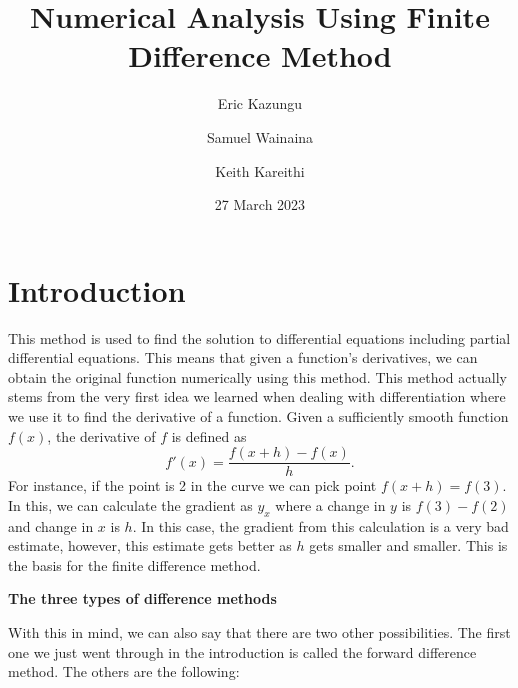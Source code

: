 \title{Numerical Analysis Using Finite Difference Method}
\author{Eric Kazungu \and Samuel Wainaina \and Keith Kareithi}

\date{27 March 2023}



\maketitle
\section*{Introduction}
This method is used to find the solution to differential equations including partial differential equations. This means that given a function's derivatives, we can obtain the original function numerically using this method. This method actually stems from the very first idea we learned when dealing with differentiation where we use it to find the derivative of a function. Given a sufficiently smooth function $f(x)$, the derivative of $f$ is defined as
\begin{equation*}
f'(x)=\frac{f(x+h)-f(x)}{h}.
\end{equation*}
For instance, if the point is 2 in the curve we can pick point $f(x+h)=f(3)$. In this, we can calculate the gradient as $y_x$ where a change in $y$ is $f(3)-f(2)$ and change in $x$ is $h$. In this case, the gradient from this calculation is a very bad estimate, however, this estimate gets better as $h$ gets smaller and smaller. This is the basis for the finite difference method.

\textbf{The three types of difference methods}

With this in mind, we can also say that there are two other possibilities. The first one we just went through in the introduction is called the forward difference method. The others are the following:

